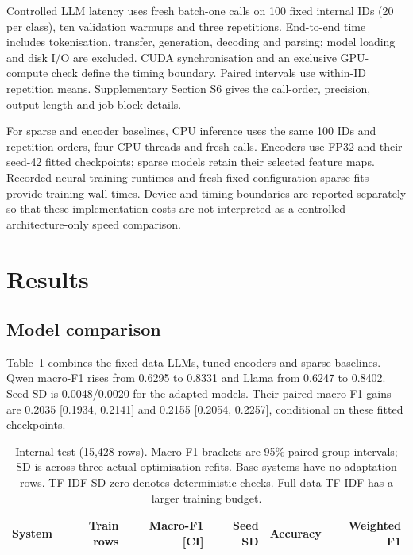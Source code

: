 \documentclass{elektr}
\renewcommand{\arraystretch}{0.94}
\begin{document}
Controlled LLM latency uses fresh batch-one calls on 100 fixed internal IDs (20 per class), ten validation warmups and three repetitions. End-to-end time includes tokenisation, transfer, generation, decoding and parsing; model loading and disk I/O are excluded. CUDA synchronisation and an exclusive GPU-compute check define the timing boundary. Paired intervals use within-ID repetition means. Supplementary Section S6 gives the call-order, precision, output-length and job-block details.

For sparse and encoder baselines, CPU inference uses the same 100 IDs and repetition orders, four CPU threads and fresh calls. Encoders use FP32 and their seed-42 fitted checkpoints; sparse models retain their selected feature maps. Recorded neural training runtimes and fresh fixed-configuration sparse fits provide training wall times. Device and timing boundaries are reported separately so that these implementation costs are not interpreted as a controlled architecture-only speed comparison.

\section{Results}
\subsection{Model comparison}
\label{sec:main-results}
Table~\ref{tab:models} combines the fixed-data LLMs, tuned encoders and sparse baselines. Qwen macro-F1 rises from 0.6295 to 0.8331 and Llama from 0.6247 to 0.8402. Seed SD is 0.0048/0.0020 for the adapted models. Their paired macro-F1 gains are 0.2035 [0.1934, 0.2141] and 0.2155 [0.2054, 0.2257], conditional on these fitted checkpoints.
\begin{table}[H]
\caption{Internal test (15,428 rows). Macro-F1 brackets are 95\% paired-group intervals; SD is across three actual optimisation refits. Base systems have no adaptation rows. TF-IDF SD zero denotes deterministic checks. Full-data TF-IDF has a larger training budget.}
\label{tab:models}\centering\small\renewcommand{\arraystretch}{1.08}\setlength{\tabcolsep}{3pt}
\begin{tabular}{@{}lrrrrr@{}}\hline
System & Train rows & Macro-F1 [CI] & Seed SD & Accuracy & Weighted F1\\\hline

\end{tabular}
\end{table}
\end{document}
